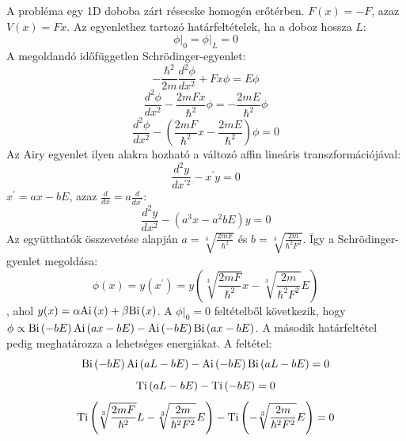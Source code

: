 A probléma egy 1D doboba zárt résecske homogén erőtérben. $F(x)=-F$, azaz $V(x) = Fx$.
	Az egyenlethez tartozó határfeltételek, ha a doboz hossza $L$:
	\begin{equation}
		\phi \big\rvert_0 = \phi \big \rvert_L = 0
	\end{equation}
	A megoldandó időfüggetlen Schrödinger-egyenlet:
	\begin{equation}
		-\frac{\hbar^2}{2m}\frac{d^2\phi}{dx^2} + Fx\phi = E\phi
	\end{equation}
	\begin{equation}
		\frac{d^2\phi}{dx^2} - \frac{2mFx}{\hbar^2}\phi = -\frac{2mE}{\hbar^2}\phi
	\end{equation}
	\begin{equation}
		\frac{d^2\phi}{dx^2} - \left(\frac{2mF}{\hbar^2}x - \frac{2mE}{\hbar^2}\right)\phi = 0
	\end{equation}
	Az Airy egyenlet ilyen alakra hozható a változó affin lineáris transzformációjával:
	\begin{equation}
		\frac{d^2y}{dx^{\prime 2}} - x^\prime y = 0
	\end{equation}
	$x^\prime = ax - bE$, azaz $\frac{d}{dx} = a\frac{d}{dx^\prime}$:
	\begin{equation}
		\frac{d^2y}{dx^2} - \left(a^3x - a^2bE\right)y = 0
	\end{equation}
	Az együtthatók összevetése alapján $a = \sqrt[3]{\frac{2mF}{\hbar^2}}$ és $b = \sqrt[3]{\frac{2m}{\hbar^2F^2}}$. Így a Schrödinger-gyenlet megoldása:
	\begin{equation}
		\phi(x) = y(x^\prime) = y\left(\sqrt[3]{\frac{2mF}{\hbar^2}}x - \sqrt[3]{\frac{2m}{\hbar^2F^2}}E\right)
	\end{equation}
	, ahol $y(x) = \alpha \mathrm{Ai}\left(x\right) + \beta \mathrm{Bi}\left(x\right)$.
	A $\phi \big\rvert_0 = 0$ feltételből következik, hogy $\phi \propto \mathrm{Bi}\left(-bE\right)\mathrm{Ai}\left(ax-bE\right) - \mathrm{Ai}\left(-bE\right)\mathrm{Bi}\left(ax-bE\right)$. A második határfeltétel pedig meghatározza a lehetséges energiákat. A feltétel:
	\begin{equation}
		\mathrm{Bi}\left(-bE\right)\mathrm{Ai}\left(aL-bE\right) - \mathrm{Ai}\left(-bE\right)\mathrm{Bi}\left(aL-bE\right) = 0
	\end{equation}
	\begin{equation}
		\label{box_energiaszintek_egyenlet}
		\mathrm{Ti}\left(aL-bE\right) - \mathrm{Ti}\left(-bE\right) = 0
	\end{equation}
	\begin{equation}
		\mathrm{Ti}\left(\sqrt[3]{\frac{2mF}{\hbar^2}}L - \sqrt[3]{\frac{2m}{\hbar^2F^2}}E\right) - \mathrm{Ti}\left(-\sqrt[3]{\frac{2m}{\hbar^2F^2}}E\right) = 0
	\end{equation}
